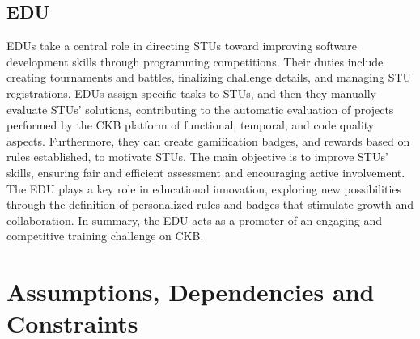 \subsection*{EDU}
EDUs take a central role in directing STUs toward improving software development skills through programming competitions.
Their duties include creating tournaments and battles, finalizing challenge details, and managing STU registrations.
EDUs assign specific tasks to STUs, and then they manually evaluate STUs' solutions, contributing to the automatic evaluation of projects performed by the CKB platform of functional, temporal, and code quality aspects.
Furthermore, they can create gamification badges, and rewards based on rules established, to motivate STUs.
The main objective is to improve STUs' skills, ensuring fair and efficient assessment and encouraging active involvement.
The EDU plays a key role in educational innovation, exploring new possibilities through the definition of personalized rules and badges that stimulate growth and collaboration.
In summary, the EDU acts as a promoter of an engaging and competitive training challenge on CKB.

\section{Assumptions, Dependencies and Constraints}


